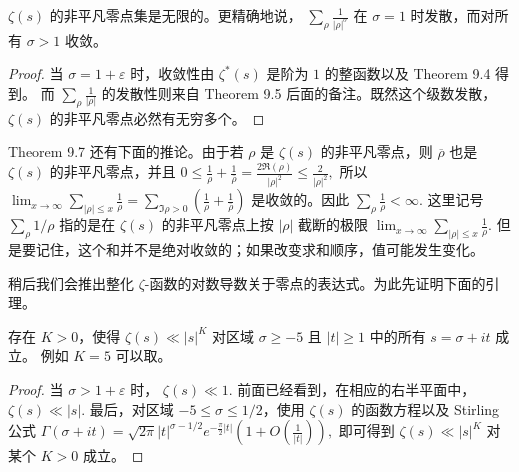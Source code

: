 \begin{theorem}[原文 Theorem 9.7]
	$\zeta(s)$ 的非平凡零点集是无限的。更精确地说，
	\(\textstyle \sum_\rho \frac{1}{|\rho|^\sigma}\)
	在 $\sigma=1$ 时发散，而对所有 $\sigma>1$ 收敛。
\end{theorem}

\begin{proof}
	当 $\sigma=1+\varepsilon$ 时，收敛性由 $\zeta^*(s)$ 是阶为 $1$ 的整函数以及 Theorem 9.4 得到。
	而
	\(\textstyle \sum_\rho \frac1{|\rho|}\)
	的发散性则来自 Theorem 9.5 后面的备注。既然这个级数发散，$\zeta(s)$ 的非平凡零点必然有无穷多个。
\end{proof}

Theorem 9.7 还有下面的推论。由于若 $\rho$ 是 $\zeta(s)$ 的非平凡零点，则
$\overline{\rho}$ 也是 $\zeta(s)$ 的非平凡零点，并且
\(\textstyle 0\leq\allowbreak{} \frac1{\rho}+\allowbreak{}\frac1{\overline{\rho}} =\allowbreak{} \frac{2\Re(\rho)}{|\rho|^2} \leq\allowbreak{} \frac{2}{|\rho|^2},\allowbreak{}\)
所以
\(\textstyle \lim_{x\to\allowbreak{}\infty}\sum_{|\rho|\leq\allowbreak{} x}\frac1{\rho} =\allowbreak{} \sum_{\Im\rho>0}\left(\frac1{\rho}+\allowbreak{}\frac1{\overline{\rho}}\right)\)
是收敛的。因此
\(\textstyle \sum_\rho \frac1{\rho}<\infty.\)
这里记号 $\sum_\rho 1/\rho$ 指的是在 $\zeta(s)$ 的非平凡零点上按 $|\rho|$ 截断的极限
\(\textstyle \lim_{x\to\allowbreak{}\infty}\sum_{|\rho|\leq\allowbreak{} x}\frac1{\rho}.\)
但是要记住，这个和并不是绝对收敛的；如果改变求和顺序，值可能发生变化。

稍后我们会推出整化 $\zeta$-函数的对数导数关于零点的表达式。为此先证明下面的引理。

\begin{lemma}[原文 Lemma 9.8]
	存在 $K>0$，使得
	\(\textstyle \zeta(s)\ll\allowbreak{} |s|^K\)
	对区域 $\sigma\geq -5$ 且 $|t|\geq 1$ 中的所有 $s=\sigma+it$ 成立。
	例如 $K=5$ 可以取。
\end{lemma}

\begin{proof}
	当 $\sigma>1+\varepsilon$ 时，
	\(\textstyle \zeta(s)\ll\allowbreak{} 1.\)
	前面已经看到，在相应的右半平面中，
	\(\textstyle \zeta(s)\ll\allowbreak{} |s|.\)
	最后，对区域 $-5\leq \sigma\leq 1/2$，使用 $\zeta(s)$ 的函数方程以及 Stirling 公式
	\(\textstyle \Gamma(\sigma+\allowbreak{}it) =\allowbreak{} \sqrt{2\pi}|t|^{\sigma-1/2}e^{-\frac{\pi}{2}|t|} \left(1+\allowbreak{}O\left(\frac1{|t|}\right)\right),\allowbreak{}\)
	即可得到
	\(\textstyle \zeta(s)\ll\allowbreak{} |s|^K\)
	对某个 $K>0$ 成立。
\end{proof}


